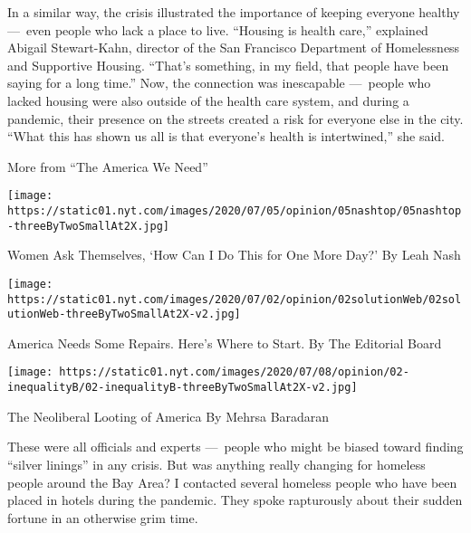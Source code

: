 In a similar way, the crisis illustrated the importance of keeping
everyone healthy ---~even people who lack a place to live. ``Housing is
health care,'' explained Abigail Stewart-Kahn, director of the San
Francisco Department of Homelessness and Supportive Housing. ``That's
something, in my field, that people have been saying for a long time.''
Now, the connection was inescapable ---~people who lacked housing were
also outside of the health care system, and during a pandemic, their
presence on the streets created a risk for everyone else in the city.
``What this has shown us all is that everyone's health is intertwined,''
she said.

More from ``The America We Need''
\href{https://www.nytimes.com/2020/07/04/opinion/sunday/women-work-coronavirus.html?action=click\&pgtype=Article\&state=default\&region=MAIN_CONTENT_2\&context=storylines_related_links}{}

\texttt{[image: https://static01.nyt.com/images/2020/07/05/opinion/05nashtop/05nashtop-threeByTwoSmallAt2X.jpg]}

Women Ask Themselves, `How Can I Do This for One More Day?' By Leah Nash

\href{https://www.nytimes.com/2020/07/02/opinion/sunday/income-inequality-solutions.html?action=click\&pgtype=Article\&state=default\&region=MAIN_CONTENT_2\&context=storylines_related_links}{}

\texttt{[image: https://static01.nyt.com/images/2020/07/02/opinion/02solutionWeb/02solutionWeb-threeByTwoSmallAt2X-v2.jpg]}

America Needs Some Repairs. Here's Where to Start. By The Editorial
Board

\href{https://www.nytimes.com/2020/07/02/opinion/private-equity-inequality.html?action=click\&pgtype=Article\&state=default\&region=MAIN_CONTENT_2\&context=storylines_related_links}{}

\texttt{[image: https://static01.nyt.com/images/2020/07/08/opinion/02-inequalityB/02-inequalityB-threeByTwoSmallAt2X-v2.jpg]}

The Neoliberal Looting of America By Mehrsa Baradaran

These were all officials and experts ---~people who might be biased
toward finding ``silver linings'' in any crisis. But was anything really
changing for homeless people around the Bay Area? I contacted several
homeless people who have been placed in hotels during the pandemic. They
spoke rapturously about their sudden fortune in an otherwise grim time.

